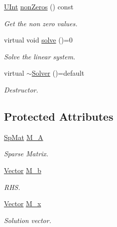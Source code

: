 \begin{DoxyCompactItemize}
\hyperlink{namespaceFVCode3D_a4bf7e328c75d0fd504050d040ebe9eda}{U\+Int} \hyperlink{classFVCode3D_1_1Solver_ad99fa52d7c034196359feb91151ba13f}{non\+Zeros} () const 
\begin{DoxyCompactList}\small\item\em Get the non zero values. \end{DoxyCompactList}\item 
virtual void \hyperlink{classFVCode3D_1_1Solver_afefcde44126886bafbc85ca0ce22dca8}{solve} ()=0
\begin{DoxyCompactList}\small\item\em Solve the linear system. \end{DoxyCompactList}\item 
virtual \hyperlink{classFVCode3D_1_1Solver_a55ed22112775550832a2c4c21776347f}{$\sim$\+Solver} ()=default
\begin{DoxyCompactList}\small\item\em Destructor. \end{DoxyCompactList}\end{DoxyCompactItemize}
\subsection*{Protected Attributes}
\begin{DoxyCompactItemize}
\item 
\hyperlink{namespaceFVCode3D_ac1032289d96638cf0ad6c52ef639095f}{Sp\+Mat} \hyperlink{classFVCode3D_1_1Solver_a7a7d556033c96bef473a2dc694af9036}{M\+\_\+A}
\begin{DoxyCompactList}\small\item\em Sparse Matrix. \end{DoxyCompactList}\item 
\hyperlink{namespaceFVCode3D_a16ccf345652402bccd1a5d2e6782526c}{Vector} \hyperlink{classFVCode3D_1_1Solver_ac1203c2ea481f5ebd0ce061c1e8073d3}{M\+\_\+b}
\begin{DoxyCompactList}\small\item\em R\+HS. \end{DoxyCompactList}\item 
\hyperlink{namespaceFVCode3D_a16ccf345652402bccd1a5d2e6782526c}{Vector} \hyperlink{classFVCode3D_1_1Solver_a6414eabf461e95a8fc5b8a49bb06e8cb}{M\+\_\+x}
\begin{DoxyCompactList}\small\item\em Solution vector. \end{DoxyCompactList}\end{DoxyCompactItemize}


